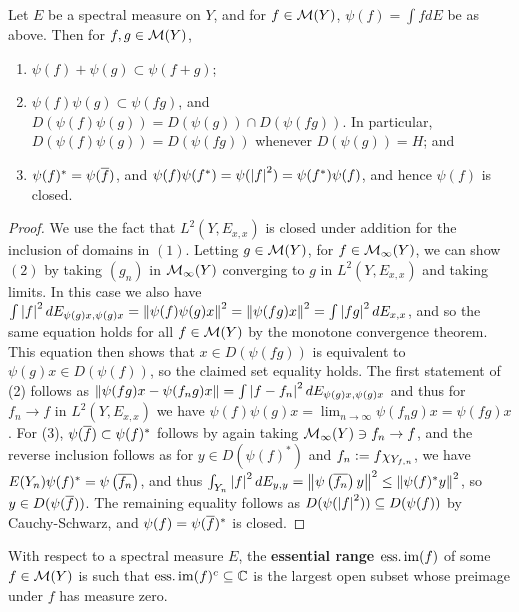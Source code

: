 \documentclass[10pt]{amsart}
\begin{document}
\begin{proposition}\label{psiprops}
    Let $E$ be a spectral measure on $Y$, and for $f \in \mathcal{M}(Y)$, $\psi(f) = \int f dE$ be as above. Then for $f, g \in \mathcal{M}(Y)$,
    \begin{enumerate}
        \item $\psi(f) + \psi(g) \subset \psi(f + g)$;
        \item $\psi(f)\psi(g) \subset \psi(fg)$, and $D(\psi(f)\psi(g)) = D(\psi(g)) \cap D(\psi(fg))$. In particular, $D(\psi(f)\psi(g)) = D(\psi(fg))$ whenever $D(\psi(g)) = H$; and
        \item $\psi(f)^* = \psi(\overline{f})$, and $\psi(f)\psi(f^*) = \psi(\left| f \right|^2) = \psi(f^*)\psi(f)$, and hence $\psi(f)$ is closed.
    \end{enumerate}
\end{proposition}
\begin{proof}
    We use the fact that $L^2(Y, E_{x, x})$ is closed under addition for the inclusion of domains in $(1)$. Letting $g \in \mathcal{M}(Y)$, for $f \in \mathcal{M}_\infty(Y)$, we can show $(2)$ by taking $(g_n)$ in $\mathcal{M}_\infty(Y)$ converging to $g$ in $L^2(Y, E_{x, x})$ and taking limits. In this case we also have $\int\left| f \right|^2 dE_{\psi(g)x, \psi(g)x} = \left\| \psi(f)\psi(g)x \right\|^2 = \left\| \psi(fg)x \right\|^2 = \int\left| fg \right|^2 dE_{x, x}$, and so the same equation holds for all $f \in \mathcal{M}(Y)$ by the monotone convergence theorem. This equation then shows that $x \in D(\psi(fg))$ is equivalent to $\psi(g)x \in D(\psi(f))$, so the claimed set equality holds. The first statement of (2) follows as $\left\| \psi(fg)x - \psi(f_ng)x \right\| = \int\left| f - f_n \right|^2dE_{\psi(g)x, \psi(g)x}$ and thus for $f_n \to f$ in $L^2(Y, E_{x, x})$ we have $\psi(f)\psi(g)x = \lim_{n \to \infty}\psi(f_n g)x = \psi(fg)x$. For (3), $\psi(\overline{f}) \subset \psi(f)^*$ follows by again taking $\mathcal{M}_\infty(Y) \ni f_n \to f$, and the reverse inclusion follows as for $y \in D(\psi(f)^*)$ and $f_n \vcentcolon= f\chi_{Y_{f, n}}$, we have $E(Y_n)\psi(f)^* = \psi\left(  \overline{f_n}  \right)$, and thus $\int_{Y_n}\left| f \right|^2 dE_{y, y} = \left\| \psi\left(  \overline{f_n}  \right)y \right\|^2 \leq \left\| \psi(f)^*y \right\|^2$, so $y \in D(\psi(\overline{f}))$. The remaining equality follows as $D(\psi(\left| f \right|^2)) \subseteq D(\psi(f))$ by Cauchy-Schwarz, and $\psi(f) = \psi(\overline{f})^*$ is closed.
\end{proof}
With respect to a spectral measure $E$, the \textbf{essential range $\operatorname{ess.im}(f)$} of some $f \in \mathcal{M}(Y)$ is such that $\operatorname{ess.im}(f)^c \subseteq \mathbb{C}$ is the largest open subset whose preimage under $f$ has measure zero.
\end{document}
